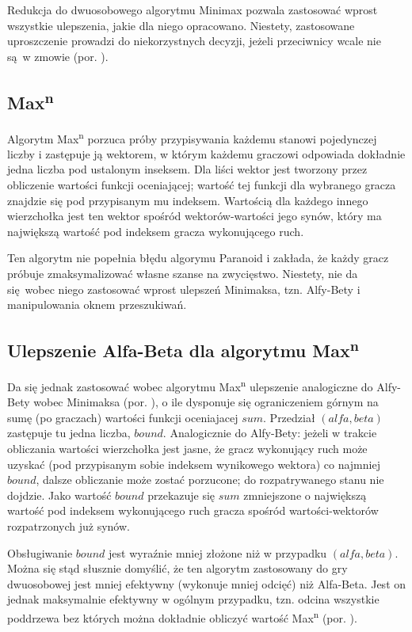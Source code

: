 \documentclass{pracamgr}
\begin{document}
Redukcja do dwuosobowego algorytmu Minimax pozwala zastosować wprost wszystkie ulepszenia, jakie dla niego opracowano.
Niestety, zastosowane uproszczenie prowadzi do niekorzystnych decyzji, jeżeli przeciwnicy wcale nie są w zmowie (por. \cite{sturtevant}).

\subsection{Max\textsuperscript{n}}

Algorytm Max\textsuperscript{n} porzuca próby przypisywania każdemu stanowi pojedynczej liczby i zastępuje ją wektorem, w którym każdemu graczowi odpowiada dokładnie jedna liczba pod ustalonym inseksem.
Dla liści wektor jest tworzony przez obliczenie wartości funkcji oceniającej; wartość tej funkcji dla wybranego gracza znajdzie się pod przypisanym mu indeksem.
Wartością dla każdego innego wierzchołka jest ten wektor spośród wektorów-wartości jego synów, który ma największą wartość pod indeksem gracza wykonującego ruch.

Ten algorytm nie popełnia błędu algorymu Paranoid i zakłada, że każdy gracz próbuje zmaksymalizować własne szanse na zwycięstwo.
Niestety, nie da się wobec niego zastosować wprost ulepszeń Minimaksa, tzn. Alfy-Bety i manipulowania oknem przeszukiwań.

\subsection*{Ulepszenie Alfa-Beta dla algorytmu Max\textsuperscript{n}}

Da się jednak zastosować wobec algorytmu Max\textsuperscript{n} ulepszenie analogiczne do Alfy-Bety wobec Minimaksa (por. \cite{korf}), o ile dysponuje się ograniczeniem górnym na sumę (po graczach) wartości funkcji oceniajacej \(sum\).
Przedział \((alfa, beta)\) zastępuje tu jedna liczba, \(bound\).
Analogicznie do Alfy-Bety: jeżeli w trakcie obliczania wartości wierzchołka jest jasne, że gracz wykonujący ruch może uzyskać (pod przypisanym sobie indeksem wynikowego wektora) co najmniej \(bound\), dalsze obliczanie może zostać porzucone; do rozpatrywanego stanu nie dojdzie.
Jako wartość \(bound\) przekazuje się \(sum\) zmniejszone o największą wartość pod indeksem wykonującego ruch gracza spośród wartości-wektorów rozpatrzonych już synów.

Obsługiwanie \(bound\) jest wyraźnie mniej złożone niż w przypadku \((alfa, beta)\).
Można się stąd słusznie domyślić, że ten algorytm zastosowany do gry dwuosobowej jest mniej efektywny (wykonuje mniej odcięć) niż Alfa-Beta.
Jest on jednak maksymalnie efektywny w ogólnym przypadku, tzn. odcina wszystkie poddrzewa bez których można dokładnie obliczyć wartość Max\textsuperscript{n} (por. \cite{korf}).
\end{document}
